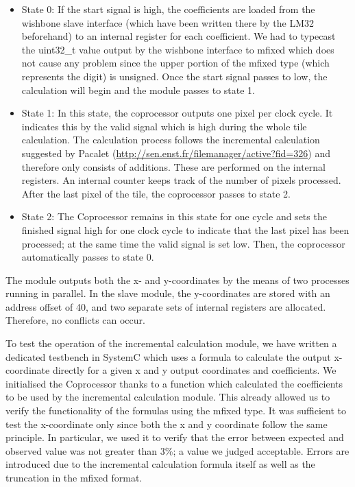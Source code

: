 \begin{itemize}
\item State 0: If the start signal is high, the coefficients are loaded from the wishbone slave interface (which have been written there by the LM32 beforehand) to an internal register for each coefficient. We had to typecast the uint32\_t value output by the wishbone interface to mfixed which does not cause any problem since the upper portion of the mfixed type (which represents the digit) is unsigned. Once the start signal passes to low, the calculation will begin and the module passes to state 1.
\item State 1: In this state, the coprocessor outputs one pixel per clock cycle. It indicates this by the valid signal which is high during the whole tile calculation. The calculation process follows the incremental calculation suggested by Pacalet (\url{http://sen.enst.fr/filemanager/active?fid=326}) and therefore only consists of additions. These are performed on the internal registers. An internal counter keeps track of the number of pixels processed. After the last pixel of the tile, the coprocessor passes to state 2.
\item State 2: The Coprocessor remains in this state for one cycle and sets the finished signal high for one clock cycle to indicate that the last pixel has been processed; at the same time the valid signal is set low. Then, the coprocessor automatically passes to state 0.

\end{itemize}

The module outputs both the x- and y-coordinates by the means of two processes running in parallel. In the slave module, the y-coordinates are stored with an address offset of 40, and two separate sets of internal registers are allocated. Therefore, no conflicts can occur.

To test the operation of the incremental calculation module, we have written a dedicated testbench in SystemC which uses a formula to calculate the output x-coordinate directly for a given x and y output coordinates and coefficients. We initialised the Coprocessor thanks to a function which calculated the coefficients to be used by the incremental calculation module. This already allowed us to verify the functionality of the formulas using the mfixed type. It was sufficient to test the x-coordinate only since both the x and y coordinate follow the same principle. In particular, we used it to verify that the error between expected and observed value was not greater than 3\%; a value we judged acceptable. Errors are introduced due to the incremental calculation formula itself as well as the truncation in the mfixed format.

